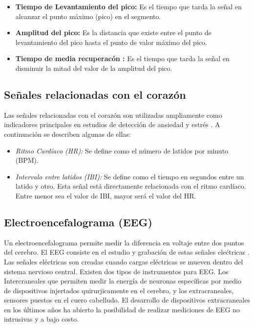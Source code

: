 \begin{itemize}
        \item{\textbf{Tiempo de Levantamiento del pico:}} Es el tiempo que tarda la se\~nal en alcanzar el punto m\'aximo (pico) en el segmento.
        \item{\textbf{Amplitud del pico:}} Es la distancia que existe entre el punto de levantamiento del pico hasta el punto de valor m\'aximo del pico.
        \item{\textbf{Tiempo de media recuperac\'on :}} Es el tiempo que tarda la se\~nal en disminuir la mitad del valor de la amplitud del pico.
\end{itemize}


	\subsection{Se\~nales relacionadas con el coraz\'on}\label{secc:hearthrate}
	Las se\~nales relacionadas con el coraz\'on son utilizadas ampliamente como indicadores principales en estudios de detecci\'on de ansiedad y estr\'es \citep{Sharma20121287}. A continuaci\'on se describen algunas de ellas:
	\begin{itemize}
		\item \textit{Ritmo Card\'iaco (HR):} Se define como el n\'umero de latidos por minuto (BPM).
		\item \textit{Intervalo entre latidos (IBI):} Se define como el tiempo en segundos entre un latido y otro. Esta se\~nal est\'a directamente relacionada con el ritmo card\'iaco. Entre menor sea el valor de IBI, mayor ser\'a el valor del HR.
	\end{itemize}
	\subsection{Electroencefalograma (EEG)}\label{secc:eeg}
	Un electroencefalograma permite medir la diferencia en voltaje entre dos puntos del cerebro. El EEG consiste en el estudio y grabaci\'on de estas se\~nales ele\'ctricas \citep{tatum2014handbook}. Las se\~nales el\'ectricas son creadas cuando cargas el\'ectricas se mueven dentro del sistema nervioso central. Existen dos tipos de instrumentos para EEG. Los Intercraneales que permiten medir la energ\'ia de neuronas espec\'ificas por medio de dispositivos injertados quirurjicamente en el cerebro, y los extracraneales, sensores puestos en el cuero cabelludo. El desarrollo de dispositivos extracraneales en los \'ultimos a\~nos ha abierto la posibilidad de realizar mediciones de EEG no intrusivas y a bajo costo.
